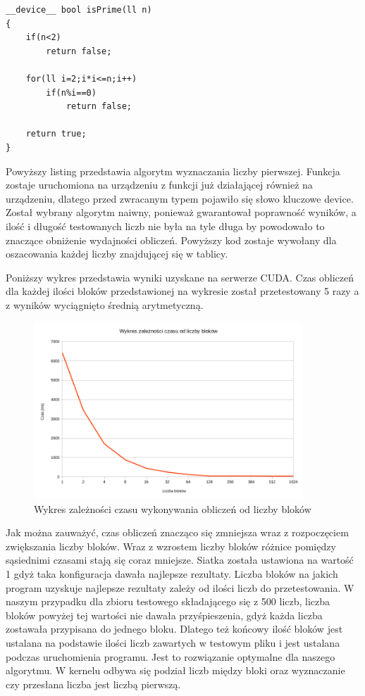 \documentclass[a4paper,12pt]{article}
\begin{document}
\begin{lstlisting}
__device__ bool isPrime(ll n)
{
    if(n<2)
        return false;
        
    for(ll i=2;i*i<=n;i++)
        if(n%i==0)
            return false; 

    return true;
}
\end{lstlisting}

Powyższy listing przedstawia algorytm wyznaczania liczby pierwszej. Funkcja zostaje uruchomiona na urządzeniu z funkcji już działającej również na urządzeniu, dlatego przed zwracanym typem pojawiło się słowo kluczowe \textunderscore \textunderscore device\textunderscore \textunderscore. Został wybrany algorytm naiwny, ponieważ gwarantował poprawność wyników, a ilość i długość testowanych liczb nie była na tyle długa by powodowało to znaczące obniżenie wydajności obliczeń. Powyższy kod zostaje wywołany dla oszacowania każdej liczby znajdującej się w tablicy.

Poniższy wykres przedstawia wyniki uzyskane na serwerze CUDA. Czas obliczeń dla każdej ilości bloków przedstawionej na wykresie został przetestowany 5 razy a z wyników wyciągnięto średnią arytmetyczną.

\begin{figure}[!ht]
	\centering
  \includegraphics[width=0.9\textwidth]{WykresCzas.png}
  \caption{Wykres zależności czasu wykonywania obliczeń od liczby bloków}
\end{figure}


Jak można zauważyć, czas obliczeń znacząco się zmniejsza wraz z rozpoczęciem zwiększania liczby bloków. Wraz z wzrostem liczby bloków różnice pomiędzy sąsiednimi czasami stają się coraz mniejsze. Siatka została ustawiona na wartość 1 gdyż taka konfiguracja dawała najlepsze rezultaty. Liczba bloków na jakich program uzyskuje najlepsze rezultaty zależy od ilości liczb do przetestowania. W naszym przypadku dla zbioru testowego składającego się z 500 liczb, liczba bloków powyżej tej wartości nie dawała przyśpieszenia, gdyż każda liczba zostawała przypisana do jednego bloku. Dlatego też końcowy ilość bloków jest ustalana na podstawie ilości liczb zawartych w testowym pliku i jest ustalana podczas uruchomienia programu. Jest to rozwiązanie optymalne dla naszego algorytmu. W kernelu odbywa się podział liczb między bloki oraz wyznaczanie czy przesłana liczba jest liczbą pierwszą.
\end{document}
